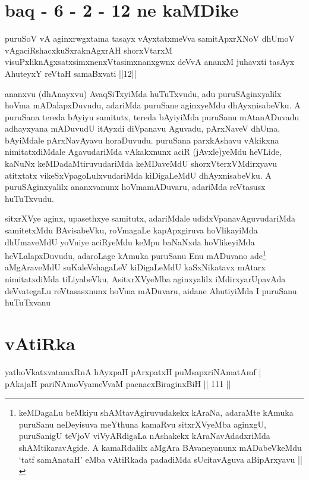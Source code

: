 \section*{baq - 6 - 2 - 12 ne kaMDike}

\begin{shl}
puruSoV vA aginxrwgxtama tasayx vAyxtatxmeVva samitApxrXNoV dhUmoV vAgaciRshacxkuSxraknAgxrAH shorxVtarxM visuPxliknAgxsatxsimxnenxVtasimxnanxgwnx deVvA ananxM juhavxti tasAyx AhuteyxY reVtaH samaBxvati ||12||
\end{shl}

\begin{artha}
ananxvu (dhAnayxvu) AvaqSiTxyiMda huTuTxvudu, adu puruSAginxyalilx
hoVma mADalapxDuvudu, adariMda puruSane aginxyeMdu dhAyxnisabeVku. A
puruSana tereda bAyiyu samitutx, tereda bAyiyiMda puruSanu
mAtanADuvadu adhayxyana mADuvudU itAyxdi diVpanavu Aguvadu, pArxNaveV
dhUma, bAyiMdale pArxNavAyavu horaDuvudu. puruSana parxkAshavu
vAkikxna nimitatxdiMdale AgavudariMda vAkakxnunx aciR (jAvxle)yeMdu
heVLide, kaNuNx keMDadaMtiruvudariMda keMDaveMdU shorxVterxVMdirxyavu
atitxtatx vikeSxVpagoLulxvudariMda kiDigaLeMdU dhAyxnisabeVku. A
puruSAginxyalilx ananxvanunx hoVmamADuvaru, adariMda reVtasusx
huTuTxvudu. 
\stext
\end{artha}

\begin{artha}
sitxrXVye aginx, upasethxye samitutx, adariMdale
udidxVpanavAguvudariMda samitetxMdu BAvisabeVku, roVmagaLe
kapApxgiruva hoVlikayiMda dhUmaveMdU yoVniye aciRyeMdu keMpu baNaNxda
hoVlikeyiMda heVLalapxDuvudu, adaroLage kAmuka puruSanu Enu mADuvano
ade\footnote{keMDagaLu beMkiyu shAMtavAgiruvudakekx kAraNa, adaraMte
  kAmuka puruSanu neDeyisuva meYthuna kamaRvu sitxrXVyeMba aginxgU,
  puruSanigU teVjoV viVyARdigaLa nAshakekx kAraNavAdadxriMda
  shAMtikaravAgide. A kamaRdalilx aMgAra BAvaneyanunx mADabeVkeMdu
 `tatf samAnataH' eMba vAtiRkada padadiMda sUcitavAguva aBipArxyavu ||} aMgAraveMdU suKaleVshagaLeV kiDigaLeMdU kaSxNikatavx
mAtarx nimitatxdiMda tiLiyabeVku, AsitxrXVyeMba aginxyalilx
iMdirxyarUpavAda deVvategaLu reVtasasxnunx hoVma mADuvaru, aidane
AhutiyiMda I puruSanu huTuTxvanu 
\end{artha}

\section*{vAtiRka}

\begin{shl}
yathoVkatxvatamxRnA hAyxpaH pArxpatxH puMsapxriNAmatAmf | \\
pAkajaH pariNAmoV\s yameVvaM pacnacxBiraginxBiH \hfill|| 111 || 
\end{shl}

